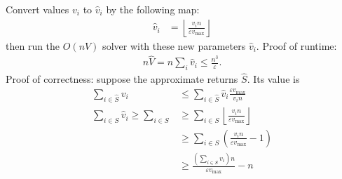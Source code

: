 Convert values \(v_i\) to \(\hat{v}_i\) by the following map:
\begin{align}
\hat{v}_i &= \left\lfloor \frac{v_i n}{\varepsilon v_\text{max}} \right\rfloor
\end{align}
then run the \(O(nV)\) solver with these  new parameters \(\hat{v}_i\).
Proof of runtime:
\begin{align}
n\hat{V} = n\sum_i \hat{v}_i \leq \frac{n^3}{\varepsilon}.
\end{align}
Proof of correctness: suppose the approximate returns \(\hat{S}\). Its value is
\begin{align}
\sum_{i \in 
	\hat{S}}
	v_i &\leq \sum_{i \in 
		\hat{S}} \hat{v}_i\frac{\varepsilon v_\text{max}}{v_in} \\
%	
\sum_{i \in 
	S} \hat{v}_i \geq \sum_{i\in S}
&\geq \sum_{i \in 
	S} \left\lfloor \frac{v_i n}{\varepsilon v_\text{max}}\right\rfloor \\
&\geq \sum_{i \in 
	S} \left(\frac{v_in}{\varepsilon v_\text{max}} - 1\right) \\
&\geq \frac{\left(\sum_{i\in S} v_i\right)n}{\varepsilon v_\text{max}} -n
\end{align}
